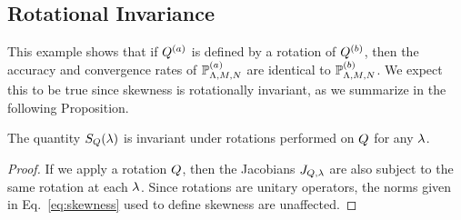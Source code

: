 \subsection{Rotational Invariance}\label{ex:rotation}
This example shows that if $Q^{(a)}$ is defined by a rotation of $Q^{(b)}$, then the accuracy and convergence rates of $\mathbb{P}^{(a)}_{{\Lambda}, M, N}$ are identical to $\mathbb{P}^{(b)}_{{\Lambda}, M, N}$.
We expect this to be true since skewness is rotationally invariant, as we summarize in the following Proposition.
\begin{prop}
The quantity $S_Q(\lambda)$ is invariant under rotations performed on $Q$ for any $\lambda$. \\
\label{prop:rot_invariance}
\end{prop}
\begin{proof}
If we apply a rotation $Q$, then the Jacobians $J_{Q, \lambda}$ are also subject to the same rotation at each $\lambda$.
Since rotations are unitary operators, the norms given in Eq.~\eqref{eq:skewness} used to define skewness are unaffected.
\end{proof}

